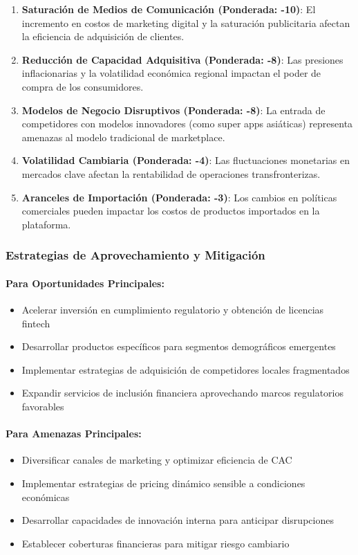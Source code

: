 \begin{enumerate}
\item \textbf{Saturación de Medios de Comunicación (Ponderada: -10)}: El incremento en costos de marketing digital y la saturación publicitaria afectan la eficiencia de adquisición de clientes.

\item \textbf{Reducción de Capacidad Adquisitiva (Ponderada: -8)}: Las presiones inflacionarias y la volatilidad económica regional impactan el poder de compra de los consumidores.

\item \textbf{Modelos de Negocio Disruptivos (Ponderada: -8)}: La entrada de competidores con modelos innovadores (como super apps asiáticas) representa amenazas al modelo tradicional de marketplace.

\item \textbf{Volatilidad Cambiaria (Ponderada: -4)}: Las fluctuaciones monetarias en mercados clave afectan la rentabilidad de operaciones transfronterizas.

\item \textbf{Aranceles de Importación (Ponderada: -3)}: Los cambios en políticas comerciales pueden impactar los costos de productos importados en la plataforma.
\end{enumerate}

\subsubsection{Estrategias de Aprovechamiento y Mitigación}

\paragraph{Para Oportunidades Principales:}
\begin{itemize}
\item Acelerar inversión en cumplimiento regulatorio y obtención de licencias fintech
\item Desarrollar productos específicos para segmentos demográficos emergentes
\item Implementar estrategias de adquisición de competidores locales fragmentados
\item Expandir servicios de inclusión financiera aprovechando marcos regulatorios favorables
\end{itemize}

\paragraph{Para Amenazas Principales:}
\begin{itemize}
\item Diversificar canales de marketing y optimizar eficiencia de CAC
\item Implementar estrategias de pricing dinámico sensible a condiciones económicas
\item Desarrollar capacidades de innovación interna para anticipar disrupciones
\item Establecer coberturas financieras para mitigar riesgo cambiario
\end{itemize}

